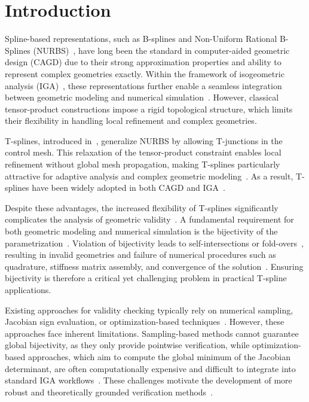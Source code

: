 \documentclass{jssc}
\begin{document}
\section{Introduction}
\label{sec:introduction}

Spline-based representations, such as B-splines and Non-Uniform Rational B-Splines (NURBS)~\citep{piegl2012nurbs}, have long been the standard in computer-aided geometric design (CAGD) due to their strong approximation properties and ability to represent complex geometries exactly. Within the framework of isogeometric analysis (IGA)~\citep{hughes2005isogeometric,cottrell2009isogeometric}, these representations further enable a seamless integration between geometric modeling and numerical simulation~\citep{xu2017unified}. However, classical tensor-product constructions impose a rigid topological structure, which limits their flexibility in handling local refinement and complex geometries.

T-splines, introduced in~\citep{sederberg2003t}, generalize NURBS by allowing T-junctions in the control mesh. This relaxation of the tensor-product constraint enables local refinement without global mesh propagation, making T-splines particularly attractive for adaptive analysis and complex geometric modeling~\citep{sederberg2004tspline,sederberg2008watertight}. As a result, T-splines have been widely adopted in both CAGD and IGA~\citep{verhoosel2011isogeometric,verhoosel2011isogeometricgradient,benson2010generalized,dorfel2010adaptive}.

Despite these advantages, the increased flexibility of T-splines significantly complicates the analysis of geometric validity~\citep{brovka2014new}. A fundamental requirement for both geometric modeling and numerical simulation is the bijectivity of the parametrization~\citep{ji2023improved}. Violation of bijectivity leads to self-intersections or fold-overs~\citep{yu2026regularity,Coons-surface}, resulting in invalid geometries and failure of numerical procedures such as quadrature, stiffness matrix assembly, and convergence of the solution~\citep{ji2021constructing}. Ensuring bijectivity is therefore a critical yet challenging problem in practical T-spline applications.

Existing approaches for validity checking typically rely on numerical sampling, Jacobian sign evaluation, or optimization-based techniques~\citep{terahara2025t,terahara2025t2}. However, these approaches face inherent limitations. Sampling-based methods cannot guarantee global bijectivity, as they only provide pointwise verification, while optimization-based approaches, which aim to compute the global minimum of the Jacobian determinant, are often computationally expensive and difficult to integrate into standard IGA workflows~\citep{lopez2017spline}. These challenges motivate the development of more robust and theoretically grounded verification methods~\citep{ji2023curvature}.
\end{document}
